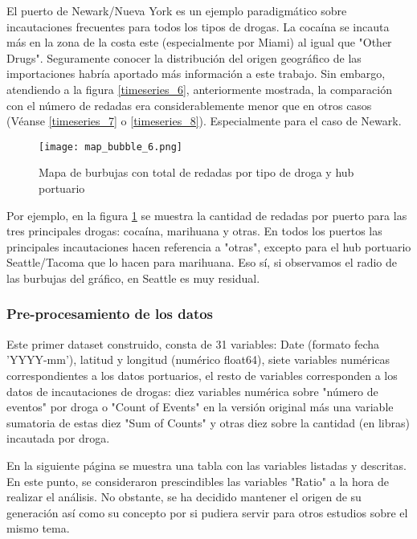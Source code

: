 \documentclass[12pt]{article}
\begin{document}
		El puerto de Newark/Nueva York es un ejemplo paradigmático sobre incautaciones frecuentes para todos los tipos de drogas. La cocaína se incauta más en la zona de la costa este (especialmente por Miami) al igual que "Other Drugs". Seguramente conocer la distribución del origen geográfico de las importaciones habría aportado más información a este trabajo. Sin embargo, atendiendo a la figura \ref{timeseries_6}, anteriormente mostrada, la comparación con el número de redadas era considerablemente menor que en otros casos (Véanse \ref{timeseries_7} o \ref{timeseries_8}). Especialmente para el caso de Newark.
		
		\begin{figure}[H]
			\caption{\label{map_bubble_6} Mapa de burbujas con total de redadas por tipo de droga y hub portuario}
			\centering
			\hspace*{1cm}
			\texttt{[image: map\_bubble\_6.png]}
		\end{figure}
		
		Por ejemplo, en la figura \ref{map_bubble_6} se muestra la cantidad de redadas por puerto para las tres principales drogas: cocaína, marihuana y otras. En todos los puertos las principales incautaciones hacen referencia a "otras", excepto para el hub portuario Seattle/Tacoma que lo hacen para marihuana. Eso sí, si observamos el radio de las burbujas del gráfico, en Seattle es muy residual.
		
		
		
		\subsubsection{\label{preprocessing}Pre-procesamiento de los datos}
		Este primer dataset construido, consta de 31 variables: Date (formato fecha 'YYYY-mm'), latitud y longitud (numérico float64), siete variables numéricas correspondientes a los datos portuarios, el resto de variables corresponden a los datos de incautaciones de drogas: diez variables numérica sobre "número de eventos" por droga o "Count of Events" en la versión original más una variable sumatoria de estas diez "Sum of Counts" y otras diez sobre la cantidad (en libras) incautada por droga.
		
		En la siguiente página se muestra una tabla con las variables listadas y descritas. En este punto, se consideraron prescindibles las variables "Ratio" a la hora de realizar el análisis. No obstante, se ha decidido mantener el origen de su generación así como su concepto por si pudiera servir para otros estudios sobre el mismo tema.
		
\end{document}
